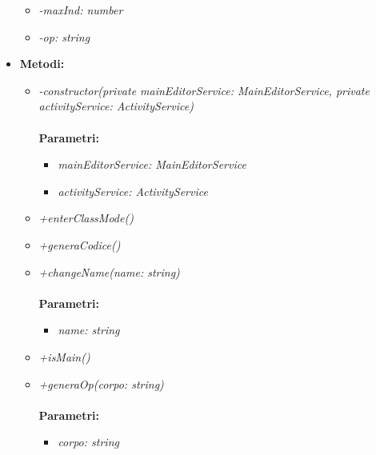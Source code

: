 \begin{itemize}
\begin{itemize}
			\item \emph{-maxInd: number}\\
			
			\item \emph{-op: string}\\
			
		\end{itemize}
	\item \textbf{Metodi:}
		\begin{itemize}
			\item \emph{-constructor(private mainEditorService: MainEditorService,
		private activityService: ActivityService)}\\
    		\\
    		\textbf{Parametri:}
    		\begin{itemize}
    			\item \emph{mainEditorService: MainEditorService}\\
    			
    			\item \emph{activityService: ActivityService}\\
    			
    		\end{itemize}
    		\item \emph{+enterClassMode()}\\
    		
    		\item \emph{+generaCodice()}\\
    		
    		\item \emph{+changeName(name: string)}\\
    		\\
    		\textbf{Parametri:}
    		\begin{itemize}
    			\item \emph{name: string}\\
    			
    		\end{itemize}
    		\item \emph{+isMain()}\\
    		
    		\item \emph{+generaOp(corpo: string)}\\
    		\\
    		\textbf{Parametri:}
    		\begin{itemize}
    			\item \emph{corpo: string}\\
    			

\end{itemize}
\end{itemize}
\end{itemize}
